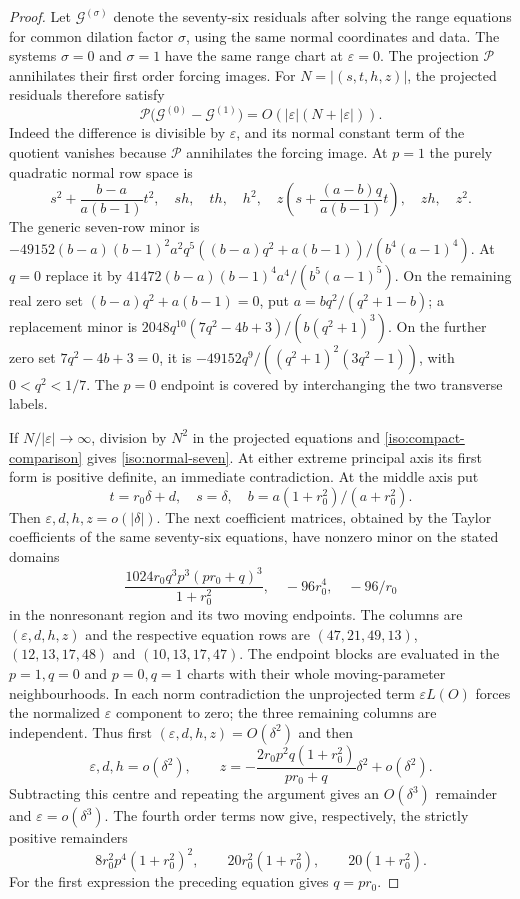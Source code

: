 \documentclass[11pt,a4paper]{article}
\numberwithin{equation}{section}
\theoremstyle{plain}
\theoremstyle{definition}
\theoremstyle{remark}
\begin{document}
\begin{proof}
Let $\boldsymbol{\mathcal G}^{(\sigma)}$ denote the seventy-six residuals
after solving the range equations for common dilation factor $\sigma$,
using the same normal coordinates and data. The systems
$\sigma=0$ and $\sigma=1$ have the same range chart at $\varepsilon=0$.
The projection $\mathcal P$ annihilates their first order forcing
images. For $N=|(s,t,h,z)|$, the projected residuals therefore satisfy
\begin{equation}\label{iso:compact-comparison}
 \mathcal P\bigl(\boldsymbol{\mathcal G}^{(0)}-\boldsymbol{\mathcal G}^{(1)}\bigr)=O(|\varepsilon|(N+|\varepsilon|)).
\end{equation}
Indeed the difference is divisible by $\varepsilon$, and its normal
constant term of the quotient vanishes because $\mathcal P$ annihilates the forcing image.
At $p=1$ the purely quadratic normal row space is
\begin{equation}\label{iso:normal-seven}
 s^2+\frac{b-a}{a(b-1)}t^2,\quad sh,\quad th,\quad h^2,
 \quad z\left(s+\frac{(a-b)q}{a(b-1)}t\right),\quad zh,\quad z^2.
\end{equation}
The generic seven-row minor is
$-49152(b-a)(b-1)^2a^2q^5((b-a)q^2+a(b-1))/(b^4(a-1)^4)$.
At $q=0$ replace it by $41472(b-a)(b-1)^4a^4/(b^5(a-1)^5)$.
On the remaining real zero set $(b-a)q^2+a(b-1)=0$, put $a=bq^2/(q^2+1-b)$; a replacement minor is
$2048q^{10}(7q^2-4b+3)/(b(q^2+1)^3)$.
On the further zero set $7q^2-4b+3=0$, it is
$-49152q^9/((q^2+1)^2(3q^2-1))$, with $0<q^2<1/7$.
The $p=0$ endpoint is covered by interchanging the two transverse labels.

If $N/|\varepsilon|\to\infty$, division by $N^2$ in the projected
equations and \eqref{iso:compact-comparison} gives
\eqref{iso:normal-seven}.  At either extreme principal axis its first
form is positive definite, an immediate contradiction.  At the middle
axis put
\[
 t=r_0\delta+d,\quad s=\delta,\quad
 b=a(1+r_0^2)/(a+r_0^2).
\]
Then $\varepsilon,d,h,z=o(|\delta|)$.
The next coefficient matrices, obtained by the Taylor coefficients of the
same seventy-six equations, have nonzero minor on the stated domains
\[
 \frac{1024r_0q^3p^3(pr_0+q)^3}{1+r_0^2},\quad
 -96r_0^4,\quad -96/r_0
\]
in the nonresonant region and its two moving endpoints.  The columns are
$(\varepsilon,d,h,z)$ and the respective equation rows are
$(47,21,49,13)$, $(12,13,17,48)$ and $(10,13,17,47)$.
The endpoint blocks are evaluated in the $p=1,q=0$ and $p=0,q=1$
charts with their whole moving-parameter neighbourhoods.
In each norm contradiction the unprojected term
$\varepsilon L(O)$ forces the normalized $\varepsilon$ component to zero;
the three remaining columns are independent.  Thus first
$(\varepsilon,d,h,z)=O(\delta^2)$ and then
\[
 \varepsilon,d,h=o(\delta^2),\qquad
 z=-\frac{2r_0p^2q(1+r_0^2)}{pr_0+q}\delta^2+o(\delta^2).
\]
Subtracting this centre and repeating the argument gives
an $O(\delta^3)$ remainder and $\varepsilon=o(\delta^3)$.
The fourth order terms now give, respectively, the strictly positive
remainders
\[
 8r_0^2p^4(1+r_0^2)^2,\qquad
 20r_0^2(1+r_0^2),\qquad20(1+r_0^2).
\]
For the first expression the preceding equation gives $q=pr_0$.


\end{proof}
\end{document}
